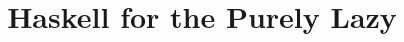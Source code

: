 \documentclass{beamer}
\title{Haskell for the Purely Lazy}
\begin{document}
\frame{\titlepage}




\end{document}
